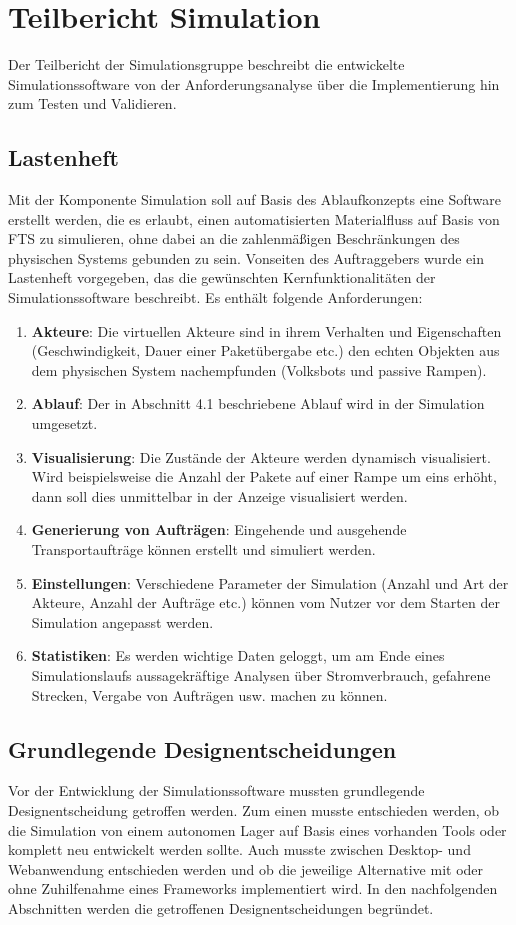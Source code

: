 \section{Teilbericht Simulation}
Der Teilbericht der Simulationsgruppe beschreibt die entwickelte Simulationssoftware von der Anforderungsanalyse über die Implementierung hin zum Testen und Validieren. 
\subsection{Lastenheft}
Mit der Komponente Simulation soll auf Basis des Ablaufkonzepts eine Software erstellt werden, die es erlaubt, einen automatisierten Materialfluss auf Basis von FTS zu simulieren, ohne dabei an die zahlenmäßigen Beschränkungen des physischen Systems gebunden zu sein. Vonseiten des Auftraggebers wurde ein Lastenheft vorgegeben, das die gewünschten Kernfunktionalitäten der Simulationssoftware beschreibt. Es enthält folgende Anforderungen:
\begin{enumerate}
\item \textbf{Akteure}: Die virtuellen Akteure sind in ihrem Verhalten und Eigenschaften (Geschwindigkeit, Dauer einer Paketübergabe etc.) den echten Objekten aus dem physischen System nachempfunden (Volksbots und passive Rampen).
\item \textbf{Ablauf}: Der in Abschnitt 4.1 beschriebene Ablauf wird in der Simulation umgesetzt. 
\item \textbf{Visualisierung}: Die Zustände der Akteure werden dynamisch visualisiert. Wird beispielsweise die Anzahl der Pakete auf einer Rampe um eins erhöht, dann soll dies unmittelbar in der Anzeige visualisiert werden.
\item \textbf{Generierung von Aufträgen}: Eingehende und ausgehende Transportaufträge können erstellt und simuliert werden. 
\item \textbf{Einstellungen}: Verschiedene Parameter der Simulation (Anzahl und Art der Akteure, Anzahl der Aufträge etc.) können vom Nutzer vor dem Starten der Simulation angepasst werden.
\item \textbf{Statistiken}: Es werden wichtige Daten geloggt, um am Ende eines Simulationslaufs aussagekräftige Analysen über Stromverbrauch, gefahrene Strecken, Vergabe von Aufträgen usw. machen zu können.
\end{enumerate}
\subsection{Grundlegende Designentscheidungen}
Vor der Entwicklung der Simulationssoftware mussten grundlegende Designentscheidung getroffen werden. Zum einen musste entschieden werden, ob die Simulation von einem autonomen Lager auf Basis eines vorhanden Tools oder komplett neu entwickelt werden sollte. Auch musste zwischen Desktop- und Webanwendung entschieden werden und ob die jeweilige Alternative mit oder ohne Zuhilfenahme eines Frameworks implementiert wird. In den nachfolgenden Abschnitten werden die getroffenen Designentscheidungen begründet.
